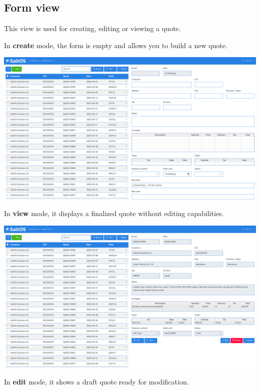\documentclass[a4paper]{article}
\begin{document}
\subsection{Form view}

This view is used for creating, editing or viewing a quote.

In \textbf{create} mode, the form is empty and allows you to build a new quote.

\begin{center}\includegraphics[width=1\textwidth]{../ujest/snaps/test-screenshots-js-screenshots-crm-quotes-create-en-us-1-snap.png}\end{center}

In \textbf{view} mode, it displays a finalized quote without editing capabilities.

\begin{center}\includegraphics[width=1\textwidth]{../ujest/snaps/test-screenshots-js-screenshots-crm-quotes-view-100-en-us-1-snap.png}\end{center}

In \textbf{edit} mode, it shows a draft quote ready for modification.
\end{document}
